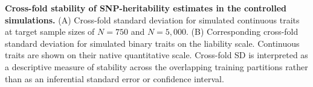 \caption{\textbf{Cross-fold stability of SNP-heritability estimates in the controlled simulations.} (A) Cross-fold standard deviation for simulated continuous traits at target sample sizes of $N=750$ and $N=5{,}000$. (B) Corresponding cross-fold standard deviation for simulated binary traits on the liability scale. Continuous traits are shown on their native quantitative scale. Cross-fold SD is interpreted as a descriptive measure of stability across the overlapping training partitions rather than as an inferential standard error or confidence interval.}
